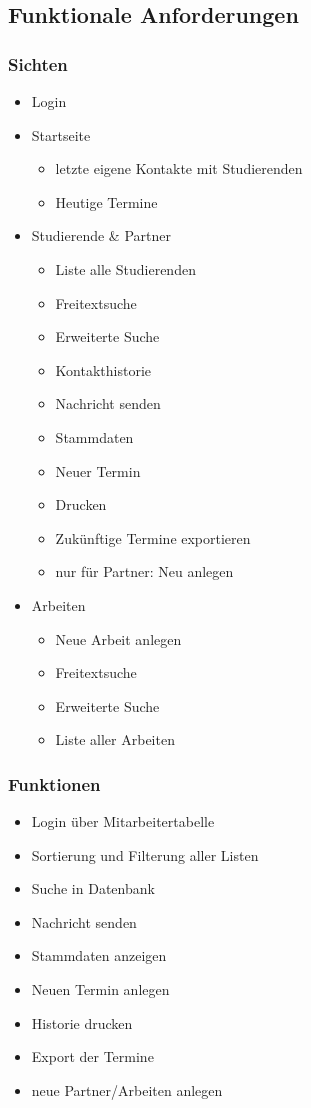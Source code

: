 \documentclass[10pt,a4paper]{article}
\begin{document}
\subsection{Funktionale Anforderungen}
\subsubsection{Sichten}
\begin{itemize}
	\item Login
	\item Startseite
	\begin{itemize}
		\item letzte eigene Kontakte mit Studierenden
		\item Heutige Termine
	\end{itemize}
	\item Studierende \& Partner
	\begin{itemize}
		\item Liste alle Studierenden
		\item Freitextsuche
		\item Erweiterte Suche
		\item Kontakthistorie
		\item Nachricht senden
		\item Stammdaten
		\item Neuer Termin
		\item Drucken
		\item Zukünftige Termine exportieren
		\item nur für Partner: Neu anlegen
	\end{itemize}
	\item Arbeiten
	\begin{itemize}
		\item Neue Arbeit anlegen
		\item Freitextsuche
		\item Erweiterte Suche
		\item Liste aller Arbeiten
	\end{itemize}
\end{itemize}

\subsubsection{Funktionen}
\begin{itemize}
	\item Login über Mitarbeitertabelle
	\item Sortierung und Filterung aller Listen
	\item Suche in Datenbank
	\item Nachricht senden
	\item Stammdaten anzeigen
	\item Neuen Termin anlegen
	\item Historie drucken
	\item Export der Termine
	\item neue Partner/Arbeiten anlegen
\end{itemize}
\end{document}
